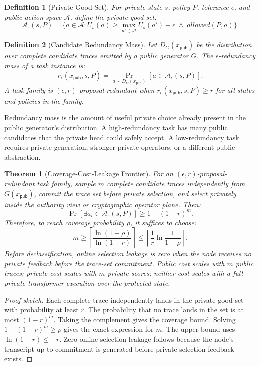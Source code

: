 \documentclass[11pt]{article}
\newtheorem{definition}{Definition}
\newtheorem{theorem}{Theorem}
\begin{document}
\begin{definition}[Private-Good Set]
For private state \(s\), policy \(P\), tolerance \(\epsilon\), and public action
space \(\mathcal{A}\), define the private-good set:
\[
\mathcal{A}_{\epsilon}(s,P)=
\{a\in\mathcal{A}:
U_s(a)\geq \max_{a'\in\mathcal{A}}U_s(a')-\epsilon
\;\wedge\; allowed(P,a)\}.
\]
\end{definition}

\begin{definition}[Candidate Redundancy Mass]
Let \(D_G(x_{\mathsf{pub}})\) be the distribution over complete candidate traces
emitted by a public generator \(G\). The \(\epsilon\)-redundancy mass of a task
instance is:
\[
r_{\epsilon}(x_{\mathsf{pub}},s,P)
=
\Pr_{a\sim D_G(x_{\mathsf{pub}})}
[a\in \mathcal{A}_{\epsilon}(s,P)].
\]
A task family is \((\epsilon,r)\)-proposal-redundant when
\(r_{\epsilon}(x_{\mathsf{pub}},s,P)\geq r\) for all states and policies in the
family.
\end{definition}

Redundancy mass is the amount of useful private choice already present in the
public generator's distribution. A high-redundancy task has many public
candidates that the private head could safely accept. A low-redundancy task
requires private generation, stronger private operators, or a different public
abstraction.

\begin{theorem}[Coverage-Cost-Leakage Frontier]
For an \((\epsilon,r)\)-proposal-redundant task family, sample \(m\) complete
candidate traces independently from \(G(x_{\mathsf{pub}})\), commit the trace
set before private selection, and select privately inside the authority view or
cryptographic operator plane. Then:
\[
\Pr[\exists a_i\in\mathcal{A}_{\epsilon}(s,P)]
\geq
1-(1-r)^m.
\]
Therefore, to reach coverage probability \(\rho\), it suffices to choose:
\[
m \geq
\left\lceil
\frac{\ln(1-\rho)}{\ln(1-r)}
\right\rceil
\leq
\left\lceil
\frac{1}{r}\ln\frac{1}{1-\rho}
\right\rceil.
\]
Before declassification, online selection leakage is zero when the node receives
no private feedback before the trace-set commitment. Public cost scales with
\(m\) public traces; private cost scales with \(m\) private scores; neither cost
scales with a full private transformer execution over the protected state.
\end{theorem}

\begin{proof}[Proof sketch]
Each complete trace independently lands in the private-good set with probability
at least \(r\). The probability that no trace lands in the set is at most
\((1-r)^m\). Taking the complement gives the coverage bound. Solving
\(1-(1-r)^m\geq \rho\) gives the exact expression for \(m\). The upper bound
uses \(\ln(1-r)\leq -r\). Zero online selection leakage follows because the
node's transcript up to commitment is generated before private selection
feedback exists.
\end{proof}
\end{document}

